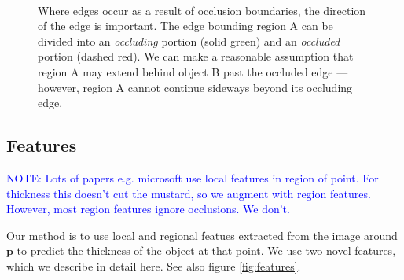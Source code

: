 \documentclass[10pt,twocolumn,letterpaper]{article}
\makeatletter
\renewcommand*{\eg}{e.g.\@\xspace}
\newcommand{\point}{\mathbf{p}}
\newcommand{\note}[1]{\textcolor{blue}{NOTE: #1}}
\makeatother
\begin{document}
\begin{figure}
    \centering 
        \hfill
     \\
    \caption{Where edges occur as a result of occlusion boundaries, the direction of the edge is important. The edge bounding region A can be divided into an \emph{occluding} portion (solid green) and an \emph{occluded} portion (dashed red).
    We can make a reasonable assumption that region A may extend behind object B past the occluded edge --- however, region A cannot continue sideways beyond its occluding edge.}
    \label{fig:occluded_region}
\end{figure}



\subsection{Features}
\note{Lots of papers \eg microsoft use local features in region of point. For thickness this doesn't cut the mustard, so we augment with region features. However, most region features ignore occlusions. We don't.}

Our method is to use local and regional featues extracted from the image around $\point$ to predict the thickness of the object at that point.
We use two novel features, which we describe in detail here. See also figure \ref{fig:features}.
\end{document}
